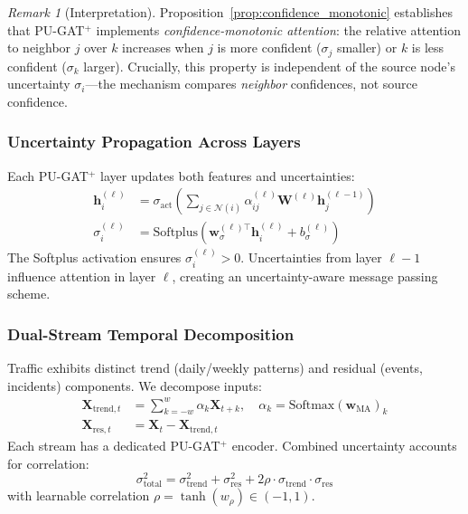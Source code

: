 \documentclass{article}
\theoremstyle{plain}
\theoremstyle{definition}
\theoremstyle{remark}
\newtheorem{remark}[theorem]{Remark}
\begin{document}
\begin{remark}[Interpretation]
Proposition~\ref{prop:confidence_monotonic} establishes that PU-GAT$^+$ implements \emph{confidence-monotonic attention}: the relative attention to neighbor $j$ over $k$ increases when $j$ is more confident ($\sigma_j$ smaller) or $k$ is less confident ($\sigma_k$ larger). Crucially, this property is independent of the source node's uncertainty $\sigma_i$---the mechanism compares \emph{neighbor} confidences, not source confidence.
\end{remark}

\subsubsection{Uncertainty Propagation Across Layers}

Each PU-GAT$^+$ layer updates both features and uncertainties:
\begin{align}
\mathbf{h}_i^{(\ell)} &= \sigma_{\text{act}}\left(\sum_{j \in \mathcal{N}(i)} \alpha_{ij}^{(\ell)} \mathbf{W}^{(\ell)} \mathbf{h}_j^{(\ell-1)}\right) \label{eq:feat_update}\\
\sigma_i^{(\ell)} &= \text{Softplus}\left(\mathbf{w}_\sigma^{(\ell)\top} \mathbf{h}_i^{(\ell)} + b_\sigma^{(\ell)}\right) \label{eq:unc_update}
\end{align}
The Softplus activation ensures $\sigma_i^{(\ell)} > 0$. Uncertainties from layer $\ell - 1$ influence attention in layer $\ell$, creating an uncertainty-aware message passing scheme.

\subsubsection{Dual-Stream Temporal Decomposition}

Traffic exhibits distinct trend (daily/weekly patterns) and residual (events, incidents) components. We decompose inputs:
\begin{align}
\mathbf{X}_{\text{trend},t} &= \sum_{k=-w}^{w} \alpha_k \mathbf{X}_{t+k}, \quad \alpha_k = \text{Softmax}(\mathbf{w}_{\text{MA}})_k \label{eq:trend}\\
\mathbf{X}_{\text{res},t} &= \mathbf{X}_t - \mathbf{X}_{\text{trend},t} \label{eq:residual}
\end{align}
Each stream has a dedicated PU-GAT$^+$ encoder. Combined uncertainty accounts for correlation:
\begin{equation}
\sigma_{\text{total}}^2 = \sigma_{\text{trend}}^2 + \sigma_{\text{res}}^2 + 2\rho \cdot \sigma_{\text{trend}} \cdot \sigma_{\text{res}}
\label{eq:combined_unc}
\end{equation}
with learnable correlation $\rho = \tanh(w_\rho) \in (-1, 1)$.
\end{document}
